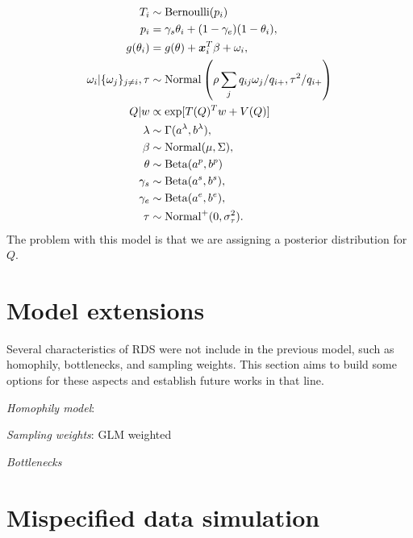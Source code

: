 \begin{equation}
  \begin{aligned}
    T_i &\sim \operatorname{Bernoulli}(p_i) \\
    p_i &= \gamma_s\theta_i + (1-\gamma_e)(1 - \theta_i),  \\
    g(\theta_i) &= g(\theta) + \boldsymbol{x}_i^T\beta + \omega_i,  \\
    \omega_i|\{\omega_j\}_{j\neq i}, \tau &\sim \operatorname{Normal}\left(\rho\sum_j q_{ij}\omega_j/q_{i+}, \tau^2/q_{i+}\right) \\
    Q|w &\propto \exp[T(Q)^Tw + V(Q)] \\
    \lambda &\sim \Gamma(a^{\lambda}, b^{\lambda}), \\ 
    \beta &\sim \operatorname{Normal}(\mu, \Sigma), \\ 
    \theta &\sim \operatorname{Beta}(a^p, b^p) \\
    \gamma_s &\sim \operatorname{Beta}(a^s, b^s), \\
    \gamma_e &\sim \operatorname{Beta}(a^e, b^e), \\  
    \tau &\sim \operatorname{Normal}^+(0,\sigma^2_{\tau}).
  \end{aligned}  
\end{equation}
The problem with this model is that we are assigning a posterior distribution
for $Q$.

\section{Model extensions}

Several characteristics of RDS were not include in the previous model, such as
homophily, bottlenecks, and sampling weights. This section aims to build some
options for these aspects and establish future works in that line. 

\begin{alineas}
  \item {\em Homophily model}: \cite{yauck2021general} 
  \item {\em Sampling weights}: GLM weighted
  \item {\em Bottlenecks}
\end{alineas}

\section{Mispecified data simulation}

